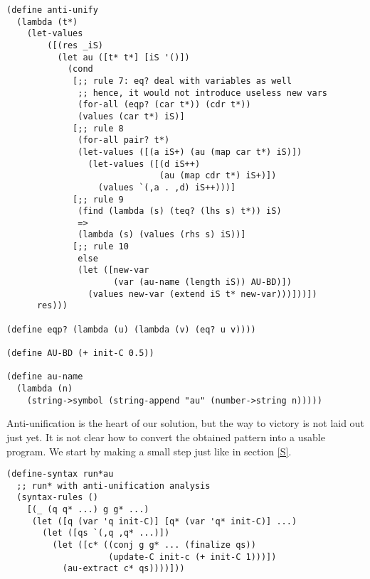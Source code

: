 \begin{lstlisting}
(define anti-unify
  (lambda (t*)
    (let-values
        ([(res _iS)
          (let au ([t* t*] [iS '()])
            (cond
             [;; rule 7: eq? deal with variables as well
              ;; hence, it would not introduce useless new vars
              (for-all (eqp? (car t*)) (cdr t*))
              (values (car t*) iS)]
             [;; rule 8
              (for-all pair? t*)
              (let-values ([(a iS+) (au (map car t*) iS)])
                (let-values ([(d iS++)
                              (au (map cdr t*) iS+)])
                  (values `(,a . ,d) iS++)))]
             [;; rule 9
              (find (lambda (s) (teq? (lhs s) t*)) iS)
              =>
              (lambda (s) (values (rhs s) iS))]
             [;; rule 10
              else
              (let ([new-var
                     (var (au-name (length iS)) AU-BD)])
                (values new-var (extend iS t* new-var)))]))])
      res)))

(define eqp? (lambda (u) (lambda (v) (eq? u v))))

(define AU-BD (+ init-C 0.5))

(define au-name
  (lambda (n)
    (string->symbol (string-append "au" (number->string n)))))
\end{lstlisting}

Anti-unification is the heart of our solution, but the way to victory is not laid out just yet. It is not clear how to convert the obtained pattern into a usable program. We start by making a small step just like in section \ref{S}.
\begin{lstlisting}
(define-syntax run*au
  ;; run* with anti-unification analysis
  (syntax-rules ()
    [(_ (q q* ...) g g* ...)
     (let ([q (var 'q init-C)] [q* (var 'q* init-C)] ...)
       (let ([qs `(,q ,q* ...)])
         (let ([c* ((conj g g* ... (finalize qs))
                    (update-C init-c (+ init-C 1)))])
           (au-extract c* qs))))]))
\end{lstlisting}

